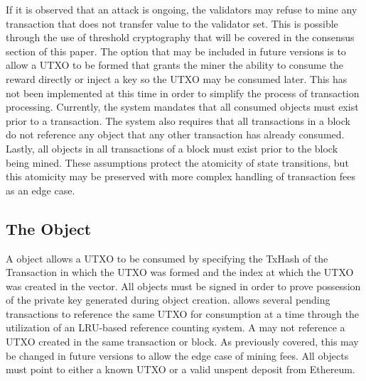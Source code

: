 If it is observed that an attack is ongoing, the validators may refuse
to mine any transaction that does not transfer value to the validator
set.
This is possible through the use of threshold cryptography that will be
covered in the consensus section of this paper.
The option that may be included in future versions is to allow a UTXO
to be formed that grants the miner the ability to consume the reward
directly or inject a key so the UTXO may be consumed later.
This has not been implemented at this time in order to simplify the
process of transaction processing.
Currently, the system mandates that all consumed objects must exist
prior to a transaction.
The system also requires that all transactions in a block do not
reference any object that any other transaction has already consumed.
Lastly, all objects in all transactions of a block must exist prior to
the block being mined.
These assumptions protect the atomicity of state transitions, but this
atomicity may be preserved with more complex handling of transaction
fees as an edge case.


\subsection{The \TxIn{} Object}



A \TxIn{} object allows a UTXO to be consumed by specifying the TxHash of
the Transaction in which the UTXO was formed and the index at which the
UTXO was created in the \Vout{} vector.
All \TxIn{} objects must be signed in order to prove possession of the
private key generated during object creation.
\LayerTwoLong{} allows several pending transactions to reference the same
UTXO for consumption at a time through the utilization of an LRU-based
reference counting system.
A \TxIn{} may not reference a UTXO created in the same transaction or
block.
As previously covered, this may be changed in future versions to allow
the edge case of mining fees.
All \TxIn{} objects must point to either a known UTXO or a valid unspent
deposit from Ethereum.

